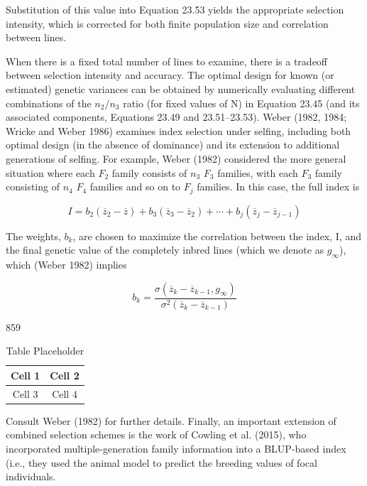 \documentclass{article}
\begin{document}
Substitution of this value into Equation 23.53 yields the appropriate selection intensity, which is corrected for both finite population size and correlation between lines.

When there is a fixed total number of lines to examine, there is a tradeoff between selection intensity and accuracy. The optimal design for known (or estimated) genetic variances can be obtained by numerically evaluating different combinations of the  $ n_{2}/n_{3} $ ratio (for fixed values of N) in Equation 23.45 (and its associated components, Equations 23.49 and 23.51–23.53). Weber (1982, 1984; Wricke and Weber 1986) examines index selection under selfing, including both optimal design (in the absence of dominance) and its extension to additional generations of selfing. For example, Weber (1982) considered the more general situation where each  $ F_{2} $ family consists of  $ n_{3} $  $ F_{3} $ families, with each  $ F_{3} $ family consisting of  $ n_{4} $  $ F_{4} $ families and so on to  $ F_{j} $ families. In this case, the full index is

\begin{equation}
I=b_{2}\left(\overline{z}_{2}-\overline{z}\right)+b_{3}\left(\overline{z}_{3}-\overline{z}_{2}\right)+\cdots+b_{j}\left(\overline{z}_{j}-\overline{z}_{j-1}\right)
\tag{23.55a}
\label{eq:23_55a}
\end{equation}

The weights,  $ b_{k} $, are chosen to maximize the correlation between the index, I, and the final genetic value of the completely inbred lines (which we denote as  $ g_{\infty} $), which (Weber 1982) implies

\begin{equation}
b_{k}=\frac{\sigma\left(\overline{z}_{k}-\overline{z}_{k-1},g_{\infty}\right)}{\sigma^{2}\left(\overline{z}_{k}-\overline{z}_{k-1}\right)}
\tag{23.55b}
\label{eq:23_55b}
\end{equation}

859

\begin{table}[h]
\centering
\begin{tabular}{|c|c|}
\hline
Cell 1 & Cell 2 \\
\hline
Cell 3 & Cell 4 \\
\hline
\end{tabular}
\caption{Table Placeholder}
\end{table}

Consult Weber (1982) for further details. Finally, an important extension of combined selection schemes is the work of Cowling et al. (2015), who incorporated multiple-generation family information into a BLUP-based index (i.e., they used the animal model to predict the breeding values of focal individuals.
\end{document}
